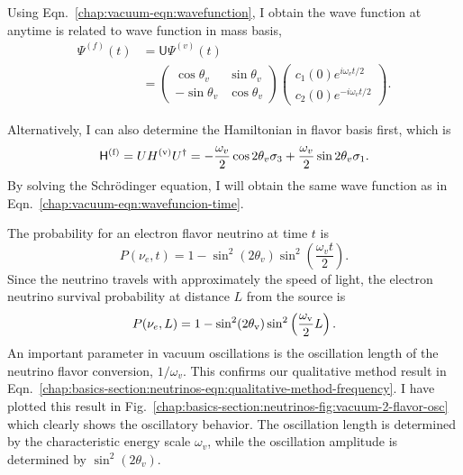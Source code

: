 Using Eqn.~\ref{chap:vacuum-eqn:wavefunction}, I obtain the wave function at anytime is related to wave function in mass basis,
\begin{align}
\Psi^{(f)}(t) &= \mathsf{U}\Psi^{(v)}(t) \\
& = \begin{pmatrix} \cos\theta_v & \sin \theta_v \\ -\sin \theta_v & \cos \theta_v \end{pmatrix} \begin{pmatrix} c_1(0) e^{i\omega_v t/2 } \\
c_2(0) e^{ -i\omega_v t/2 }    \end{pmatrix} .
\label{chap:vacuum-eqn:wavefuncion-time}
\end{align}

Alternatively, I can also determine the Hamiltonian in flavor basis first, which is
\begin{equation}
\mathsf H^{(\ff)} = U H^{(\vv)} U^\dagger = -\frac{\omega_v}{2}\cos 2\theta_v \sigma_3 + \frac{\omega_v}{2} \sin 2\theta_v \sigma_1.
    \label{chap:basics-sec:vacuum-osc-eqn:hamiltonian-vacuum}
\end{equation}
By solving the Schr\"{o}dinger equation, I will obtain the same wave function as in Eqn.~\ref{chap:vacuum-eqn:wavefuncion-time}.

The probability for an electron flavor neutrino at time $t$ is
\begin{equation}
P(\nu_e,t) = 1-\sin^2(2\theta_v)\sin^2\left( \frac{\omega_v t}{2} \right).
\end{equation}
Since the neutrino travels with approximately the speed of light, the electron neutrino survival probability at distance $L$ from the source is
\begin{equation}
P(\nu_e,L) =  1-\sin^2(2\theta_\mathrm v)\sin^2\left( \frac{\omega_\mathrm v}{2} L \right).
\end{equation}
An important parameter in vacuum oscillations is the oscillation length of the neutrino flavor conversion, $1/\omega_v$. This confirms our qualitative method result in Eqn.~\ref{chap:basics-section:neutrinos-eqn:qualitative-method-frequency}. I have plotted this result in Fig.~\ref{chap:basics-section:neutrinos-fig:vacuum-2-flavor-osc} which clearly shows the oscillatory behavior. The oscillation length is determined by the characteristic energy scale $\omega_v$, while the oscillation amplitude is determined by $\sin^2(2\theta_v)$.

